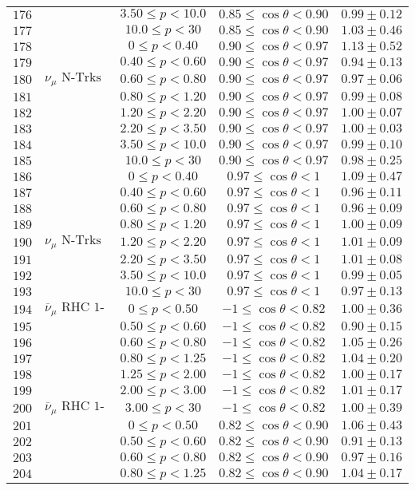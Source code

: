\begin{longtable}[c]{ccccc}
$176$ &  & $3.50\leq p<10.0$ & $0.85\leq\cos\theta<0.90$ & $0.99\pm0.12$\tabularnewline
$177$ &  & $10.0\leq p<30$ & $0.85\leq\cos\theta<0.90$ & $1.03\pm0.46$\tabularnewline
$178$ &  & $0\leq p<0.40$ & $0.90\leq\cos\theta<0.97$ & $1.13\pm0.52$\tabularnewline
$179$ &  & $0.40\leq p<0.60$ & $0.90\leq\cos\theta<0.97$ & $0.94\pm0.13$\tabularnewline
$180$ & $\nu_{\mu}\text{ N-Trks Wtr}$ & $0.60\leq p<0.80$ & $0.90\leq\cos\theta<0.97$ & $0.97\pm0.06$\tabularnewline
$181$ &  & $0.80\leq p<1.20$ & $0.90\leq\cos\theta<0.97$ & $0.99\pm0.08$\tabularnewline
$182$ &  & $1.20\leq p<2.20$ & $0.90\leq\cos\theta<0.97$ & $1.00\pm0.07$\tabularnewline
$183$ &  & $2.20\leq p<3.50$ & $0.90\leq\cos\theta<0.97$ & $1.00\pm0.03$\tabularnewline
$184$ &  & $3.50\leq p<10.0$ & $0.90\leq\cos\theta<0.97$ & $0.99\pm0.10$\tabularnewline
$185$ &  & $10.0\leq p<30$ & $0.90\leq\cos\theta<0.97$ & $0.98\pm0.25$\tabularnewline
$186$ &  & $0\leq p<0.40$ & $0.97\leq\cos\theta<1$ & $1.09\pm0.47$\tabularnewline
$187$ &  & $0.40\leq p<0.60$ & $0.97\leq\cos\theta<1$ & $0.96\pm0.11$\tabularnewline
$188$ &  & $0.60\leq p<0.80$ & $0.97\leq\cos\theta<1$ & $0.96\pm0.09$\tabularnewline
$189$ &  & $0.80\leq p<1.20$ & $0.97\leq\cos\theta<1$ & $1.00\pm0.09$\tabularnewline
$190$ & $\nu_{\mu}\text{ N-Trks Wtr}$ & $1.20\leq p<2.20$ & $0.97\leq\cos\theta<1$ & $1.01\pm0.09$\tabularnewline
$191$ &  & $2.20\leq p<3.50$ & $0.97\leq\cos\theta<1$ & $1.01\pm0.08$\tabularnewline
$192$ &  & $3.50\leq p<10.0$ & $0.97\leq\cos\theta<1$ & $0.99\pm0.05$\tabularnewline
$193$ &  & $10.0\leq p<30$ & $0.97\leq\cos\theta<1$ & $0.97\pm0.13$\tabularnewline
$194$ & $\overline{\nu}_{\mu}\text{ RHC 1-Trk Wtr}$ & $0\leq p<0.50$ & $-1\leq\cos\theta<0.82$ & $1.00\pm0.36$\tabularnewline
$195$ &  & $0.50\leq p<0.60$ & $-1\leq\cos\theta<0.82$ & $0.90\pm0.15$\tabularnewline
$196$ &  & $0.60\leq p<0.80$ & $-1\leq\cos\theta<0.82$ & $1.05\pm0.26$\tabularnewline
$197$ &  & $0.80\leq p<1.25$ & $-1\leq\cos\theta<0.82$ & $1.04\pm0.20$\tabularnewline
$198$ &  & $1.25\leq p<2.00$ & $-1\leq\cos\theta<0.82$ & $1.00\pm0.17$\tabularnewline
$199$ &  & $2.00\leq p<3.00$ & $-1\leq\cos\theta<0.82$ & $1.01\pm0.17$\tabularnewline
$200$ & $\overline{\nu}_{\mu}\text{ RHC 1-Trk Wtr}$ & $3.00\leq p<30$ & $-1\leq\cos\theta<0.82$ & $1.00\pm0.39$\tabularnewline
$201$ &  & $0\leq p<0.50$ & $0.82\leq\cos\theta<0.90$ & $1.06\pm0.43$\tabularnewline
$202$ &  & $0.50\leq p<0.60$ & $0.82\leq\cos\theta<0.90$ & $0.91\pm0.13$\tabularnewline
$203$ &  & $0.60\leq p<0.80$ & $0.82\leq\cos\theta<0.90$ & $0.97\pm0.16$\tabularnewline
$204$ &  & $0.80\leq p<1.25$ & $0.82\leq\cos\theta<0.90$ & $1.04\pm0.17$\tabularnewline

\end{longtable}
